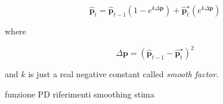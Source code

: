 \begin{equation}
    \hat{\boldsymbol{p}}_{t} = \hat{\boldsymbol{p}}_{t-1} (1-e^{k\Delta{\boldsymbol{p}}}) + \hat{\boldsymbol{p}}^{\star}_{t}(e^{k\Delta{\boldsymbol{p}}})
\end{equation}

where

\begin{equation}
    \Delta{\boldsymbol{p}} = (\hat{\boldsymbol{p}}_{t-1} - \hat{\boldsymbol{p}}_t^\star)^2
\end{equation}

and $k$ is just a real negative constant called \emph{smooth factor}.

funzione PD riferimenti smoothing stima
